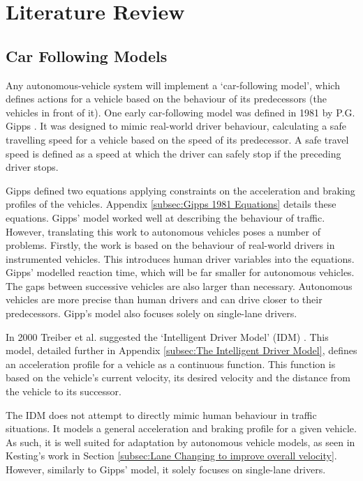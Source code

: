 \chapter{Literature Review}
\label{cha:Literature Review}

\section{Car Following Models}
\label{sec:Car Following Models}
Any autonomous-vehicle system will implement a `car-following model', which defines actions for a vehicle based on the behaviour of its predecessors (the vehicles in front of it). One early car-following model was defined in 1981 by P.G. Gipps \citep{Gipps1981}. It was designed to mimic real-world driver behaviour, calculating a safe travelling speed for a vehicle based on the speed of its predecessor. A safe travel speed is defined as a speed at which the driver can safely stop if the preceding driver stops.

Gipps defined two equations applying constraints on the acceleration and braking profiles of the vehicles. Appendix \ref{subsec:Gipps 1981 Equations} details these equations. Gipps' model worked well at describing the behaviour of traffic. However, translating this work to autonomous vehicles poses a number of problems. Firstly, the work is based on the behaviour of real-world drivers in instrumented vehicles. This introduces human driver variables into the equations. Gipps' modelled reaction time, which will be far smaller for autonomous vehicles. The gaps between successive vehicles are also larger than necessary. Autonomous vehicles are more precise than human drivers and can drive closer to their predecessors. Gipp's model also focuses solely on single-lane drivers.

In 2000 Treiber et al. suggested the `Intelligent Driver Model' (IDM) \citep{Treiber2000}. This model, detailed further in Appendix \ref{subsec:The Intelligent Driver Model}, defines an acceleration profile for a vehicle as a continuous function. This function is based on the vehicle's current velocity, its desired velocity and the distance from the vehicle to its successor.

The IDM does not attempt to directly mimic human behaviour in traffic situations. It models a general acceleration and braking profile for a given vehicle. As such, it is well suited for adaptation by autonomous vehicle models, as seen in Kesting's work \citep{Kesting2007} in Section \ref{subsec:Lane Changing to improve overall velocity}. However, similarly to Gipps' model, it solely focuses on single-lane drivers.

